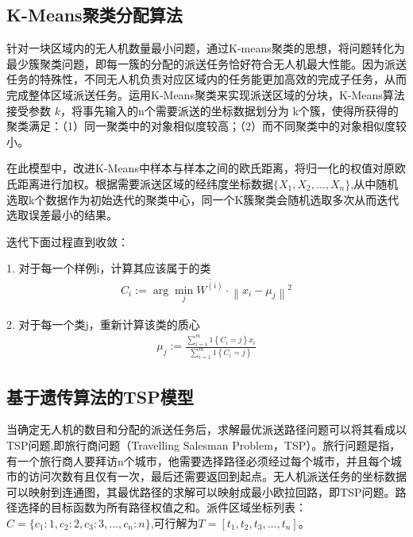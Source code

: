 \documentclass[twocolumn]{jbuaa}
\begin{document}
	\subsection{K-Means聚类分配算法}

	针对一块区域内的无人机数量最小问题，通过K-means聚类的思想，将问题转化为最少簇聚类问题，即每一簇的分配的派送任务恰好符合无人机最大性能。因为派送任务的特殊性，不同无人机负责对应区域内的任务能更加高效的完成子任务，从而完成整体区域派送任务。运用K-Means聚类来实现派送区域的分块，K-Means算法接受参数 $k$，将事先输入的n个需要派送的坐标数据划分为 k个簇，使得所获得的聚类满足：（1）同一聚类中的对象相似度较高；（2）而不同聚类中的对象相似度较小。

	在此模型中，改进K-Means中样本与样本之间的欧氏距离，将归一化的权值对原欧氏距离进行加权。根据需要派送区域的经纬度坐标数据$\{X_{1},X_{2},...,X_{n}\}$,从中随机选取k个数据作为初始迭代的聚类中心，同一个K簇聚类会随机选取多次从而迭代选取误差最小的结果。

	迭代下面过程直到收敛：

	1. 对于每一个样例i，计算其应该属于的类
	\begin{eqnarray}
		C_{i}:=\arg \min _{j}\overline {W^{\left( i\right) }}\cdot \left\| x_{i}-\mu _{j}\right\| ^{2}
	\end{eqnarray}

	2. 对于每一个类j，重新计算该类的质心
	\begin{eqnarray}
		\mu _{j}:=\frac {\sum ^{m}_{i=1}1\left\{ C_{i}=j\right\} x_{i}}{\sum ^{m}_{i=1}1\left\{ C_{i}=j\right\} }
	\end{eqnarray}











	\subsection{基于遗传算法的TSP模型}
	当确定无人机的数目和分配的派送任务后，求解最优派送路径问题可以将其看成以TSP问题,即旅行商问题（Travelling Salesman Problem，TSP）。旅行问题是指，有一个旅行商人要拜访n个城市，他需要选择路径必须经过每个城市，并且每个城市的访问次数有且仅有一次，最后还需要返回到起点。无人机派送任务的坐标数据可以映射到连通图，其最优路径的求解可以映射成最小欧拉回路，即TSP问题。路径选择的目标函数为所有路径权值之和。派件区域坐标列表：$C = \{c_{1}:1,c_{2}:2,c_{3}:3,...,c_{n}:n\}$,可行解为$T = [t_{1},t_{2},t_{3},...,t_{n}]$。
\end{document}
